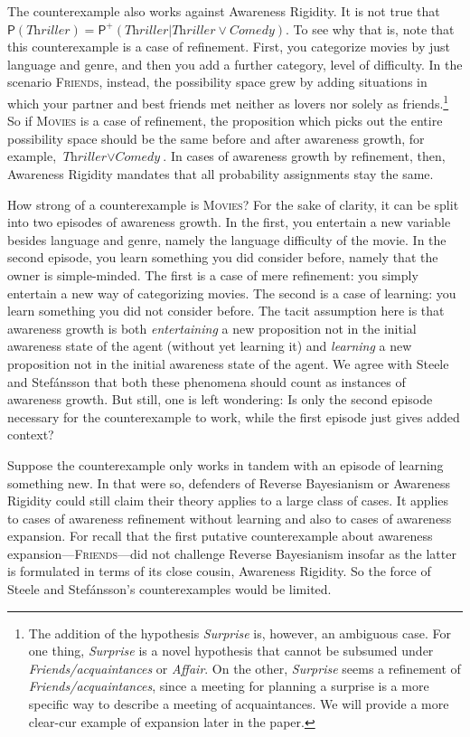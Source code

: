 \documentclass[
  11pt,
  dvipsnames,enabledeprecatedfontcommands]{scrartcl}
\newcommand{\pr}[1]{\ensuremath{\mathsf{P}(#1)}}
\newcommand{\ppr}[2]{\ensuremath{\mathsf{P}^{#1}(#2)}}
\begin{document}
The counterexample also works against Awareness Rigidity. It is not true
that
\(\pr{\textit{Thriller}}=\ppr{+}{\textit{Thriller} \vert \textit{Thriller}\vee \textit{Comedy}}\).
To see why that is, note that this counterexample is a case of
refinement. First, you categorize movies by just language and genre, and
then you add a further category, level of difficulty. In the scenario
\textsc{Friends}, instead, the possibility space grew by adding
situations in which your partner and best friends met neither as lovers
nor solely as friends.\footnote{The addition of the hypothesis
  \textit{Surprise} is, however, an ambiguous case. For one thing,
  \textit{Surprise} is a novel hypothesis that cannot be subsumed under
  \textit{Friends/acquaintances} or \textit{Affair}. On the other,
  \textit{Surprise} seems a refinement of
  \textit{Friends/acquaintances}, since a meeting for planning a
  surprise is a more specific way to describe a meeting of
  acquaintances. We will provide a more clear-cur example of expansion
  later in the paper.} So if \textsc{Movies} is a case of refinement,
the proposition which picks out the entire possibility space should be
the same before and after awareness growth, for example,
\(\textit{Thriller}\vee \textit{Comedy}\). In cases of awareness growth
by refinement, then, Awareness Rigidity mandates that all probability
assignments stay the same.

How strong of a counterexample is \textsc{Movies}? For the sake of
clarity, it can be split into two episodes of awareness growth. In the
first, you entertain a new variable besides language and genre, namely
the language difficulty of the movie. In the second episode, you learn
something you did consider before, namely that the owner is
simple-minded. The first is a case of mere refinement: you simply
entertain a new way of categorizing movies. The second is a case of
learning: you learn something you did not consider before. The tacit
assumption here is that awareness growth is both \textit{entertaining} a
new proposition not in the initial awareness state of the agent (without
yet learning it) and \textit{learning} a new proposition not in the
initial awareness state of the agent. We agree with Steele and
Stefánsson that both these phenomena should count as instances of
awareness growth. But still, one is left wondering: Is only the second
episode necessary for the counterexample to work, while the first
episode just gives added context?

Suppose the counterexample only works in tandem with an episode of
learning something new. In that were so, defenders of Reverse
Bayesianism or Awareness Rigidity could still claim their theory applies
to a large class of cases. It applies to cases of awareness refinement
without learning and also to cases of awareness expansion. For recall
that the first putative counterexample about awareness
expansion---\textsc{Friends}---did not challenge Reverse Bayesianism
insofar as the latter is formulated in terms of its close cousin,
Awareness Rigidity. So the force of Steele and Stefánsson's
counterexamples would be limited.
\end{document}
